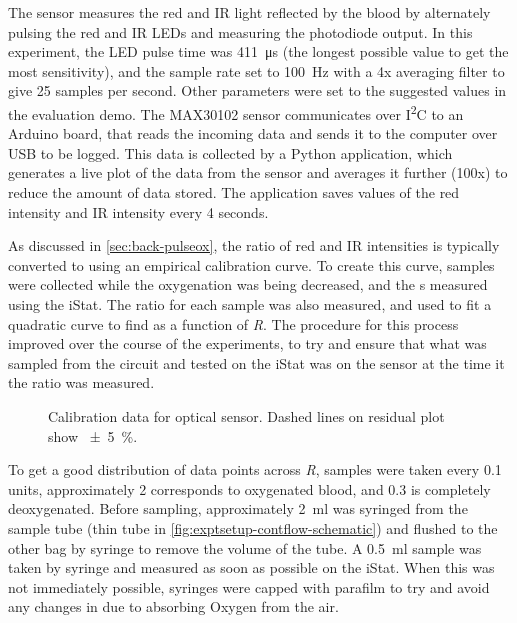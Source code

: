 The sensor measures the red and IR light reflected by the blood by alternately pulsing the red and IR LEDs and measuring the photodiode output.
In this experiment, the LED pulse time was \SI{411}{\micro\second} (the longest possible value to get the most sensitivity), and the sample rate set to \SI{100}{Hz} with a 4x averaging filter to give 25 samples per second.
Other parameters were set to the suggested values in the evaluation demo.
The MAX30102 sensor communicates over I\textsuperscript{2}C to an Arduino board, that reads the incoming data and sends it to the computer over USB to be logged.
This data is collected by a Python application, which generates a live plot of the data from the sensor and averages it further (100x) to reduce the amount of data stored.
The application saves values of the red intensity and IR intensity every 4 seconds.

As discussed in \autoref{sec:back-pulseox}, the ratio of red and IR intensities is typically converted to \SOtwo using an empirical calibration curve.
To create this curve, samples were collected while the oxygenation was being decreased, and the \SOtwo{}s measured using the iStat.
The ratio for each sample was also measured, and used to fit a quadratic curve to find \SOtwo as a function of \textit{R}.
The procedure for this process improved over the course of the experiments, to try and ensure that what was sampled from the circuit and tested on the iStat was on the sensor at the time it the ratio was measured.
\begin{figure}[t]
\centering
{}
\caption[Calibration data for optical \SOtwo sensor]{Calibration data for optical \SOtwo sensor. Dashed lines on residual plot show \SI{\pm5}{\percent}.}
\label{fig:exptsetup-oximetercal}
\end{figure}
To get a good distribution of data points across \textit{R}, samples were taken every 0.1 units, approximately 2 corresponds to oxygenated blood, and 0.3 is completely deoxygenated.
Before sampling, approximately \SI{2}{ml} was syringed from the sample tube (thin tube in \autoref{fig:exptsetup-contflow-schematic}) and flushed to the other bag by syringe to remove the volume of the tube.
A \SI{0.5}{ml} sample was taken by syringe and measured as soon as possible on the iStat.
When this was not immediately possible, syringes were capped with parafilm to try and avoid any changes in \SOtwo due to absorbing Oxygen from the air.

